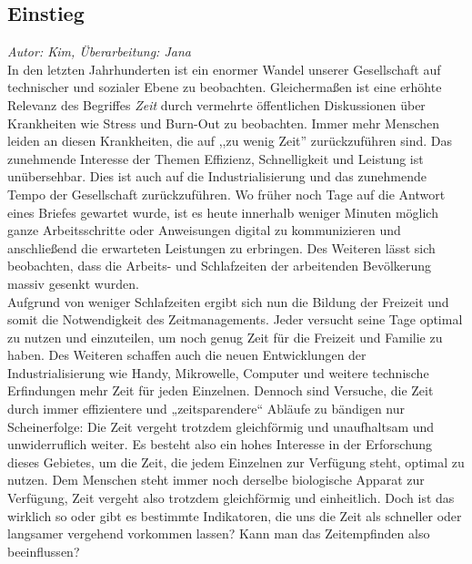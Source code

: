 \documentclass{Paper}
\begin{document}
\subsection{Einstieg}
\textit{Autor: Kim, Überarbeitung: Jana}\\
In den letzten Jahrhunderten ist ein enormer Wandel unserer Gesellschaft auf technischer und sozialer Ebene zu beobachten. Gleichermaßen ist eine erhöhte Relevanz des Begriffes \textit{Zeit} durch vermehrte öffentlichen Diskussionen über Krankheiten wie Stress und Burn-Out zu beobachten. Immer mehr Menschen leiden an diesen Krankheiten, die auf ,,zu wenig Zeit'' zurückzuführen sind. Das zunehmende Interesse der Themen Effizienz, Schnelligkeit und Leistung ist unübersehbar. 
Dies ist auch auf die Industrialisierung und das zunehmende Tempo der Gesellschaft zurückzuführen. \cite{Wallisch2003} Wo früher noch Tage auf die Antwort eines Briefes gewartet wurde, ist es heute innerhalb weniger Minuten möglich ganze Arbeitsschritte oder Anweisungen digital zu kommunizieren und anschließend die erwarteten Leistungen zu erbringen.
Des Weiteren lässt sich beobachten, dass die Arbeits- und Schlafzeiten der arbeitenden Bevölkerung massiv gesenkt wurden. \cite{DeutscheSozialgeschichte}\\
Aufgrund von weniger Schlafzeiten ergibt sich nun die Bildung der Freizeit und somit die Notwendigkeit des Zeitmanagements. Jeder versucht seine Tage optimal zu nutzen und einzuteilen, um noch genug Zeit für die Freizeit und Familie zu haben. Des Weiteren schaffen auch die neuen Entwicklungen der Industrialisierung wie Handy, Mikrowelle, Computer und weitere technische Erfindungen mehr Zeit für jeden Einzelnen. Dennoch sind Versuche, die Zeit durch immer effizientere und „zeitsparendere“ Abläufe zu bändigen nur Scheinerfolge: Die Zeit vergeht trotzdem gleichförmig und unaufhaltsam und unwiderruflich weiter. \cite{Wallisch2003} Es besteht also ein hohes Interesse in der Erforschung dieses Gebietes, um die Zeit, die jedem Einzelnen zur Verfügung steht, optimal zu nutzen.
Dem Menschen steht immer noch derselbe biologische Apparat zur Verfügung, Zeit vergeht also trotzdem gleichförmig und einheitlich. Doch ist das wirklich so oder gibt es bestimmte Indikatoren, die uns die Zeit als schneller oder langsamer vergehend vorkommen lassen? Kann man das Zeitempfinden also beeinflussen?
\end{document}
